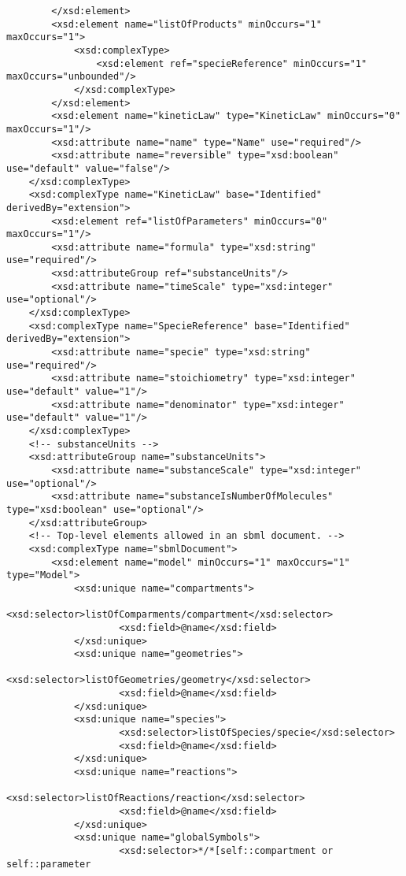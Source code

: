 \documentclass[10pt]{cek-article}
\begin{document}
\begin{small}
\begin{verbatim}
        </xsd:element>
        <xsd:element name="listOfProducts" minOccurs="1" maxOccurs="1">
            <xsd:complexType>
                <xsd:element ref="specieReference" minOccurs="1" maxOccurs="unbounded"/>
            </xsd:complexType>
        </xsd:element>
        <xsd:element name="kineticLaw" type="KineticLaw" minOccurs="0" maxOccurs="1"/>
        <xsd:attribute name="name" type="Name" use="required"/>
        <xsd:attribute name="reversible" type="xsd:boolean" use="default" value="false"/>
    </xsd:complexType>
    <xsd:complexType name="KineticLaw" base="Identified" derivedBy="extension">
        <xsd:element ref="listOfParameters" minOccurs="0" maxOccurs="1"/>
        <xsd:attribute name="formula" type="xsd:string" use="required"/>
        <xsd:attributeGroup ref="substanceUnits"/>
        <xsd:attribute name="timeScale" type="xsd:integer" use="optional"/>
    </xsd:complexType>
    <xsd:complexType name="SpecieReference" base="Identified" derivedBy="extension">
        <xsd:attribute name="specie" type="xsd:string" use="required"/>
        <xsd:attribute name="stoichiometry" type="xsd:integer" use="default" value="1"/>
        <xsd:attribute name="denominator" type="xsd:integer" use="default" value="1"/>
    </xsd:complexType>
    <!-- substanceUnits -->
    <xsd:attributeGroup name="substanceUnits">
        <xsd:attribute name="substanceScale" type="xsd:integer" use="optional"/>
        <xsd:attribute name="substanceIsNumberOfMolecules" type="xsd:boolean" use="optional"/>
    </xsd:attributeGroup>
    <!-- Top-level elements allowed in an sbml document. -->
    <xsd:complexType name="sbmlDocument">
        <xsd:element name="model" minOccurs="1" maxOccurs="1" type="Model">
            <xsd:unique name="compartments">
                    <xsd:selector>listOfComparments/compartment</xsd:selector>
                    <xsd:field>@name</xsd:field>
            </xsd:unique>
            <xsd:unique name="geometries">
                    <xsd:selector>listOfGeometries/geometry</xsd:selector>
                    <xsd:field>@name</xsd:field>
            </xsd:unique>
            <xsd:unique name="species">
                    <xsd:selector>listOfSpecies/specie</xsd:selector>
                    <xsd:field>@name</xsd:field>
            </xsd:unique>
            <xsd:unique name="reactions">
                    <xsd:selector>listOfReactions/reaction</xsd:selector>
                    <xsd:field>@name</xsd:field>
            </xsd:unique>
            <xsd:unique name="globalSymbols">
                    <xsd:selector>*/*[self::compartment or self::parameter

\end{verbatim}
\end{small}
\end{document}
